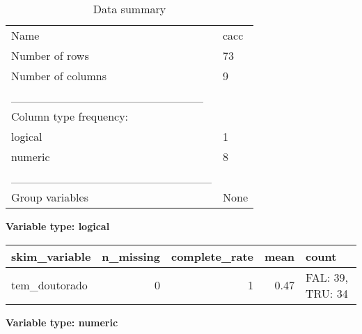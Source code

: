 \documentclass[
]{article}
\begin{document}
\begin{longtable}[]{@{}ll@{}}
\caption{Data summary}\tabularnewline
\toprule\noalign{}
\endfirsthead
\endhead
\bottomrule\noalign{}
\endlastfoot
Name & cacc \\
Number of rows & 73 \\
Number of columns & 9 \\
\_\_\_\_\_\_\_\_\_\_\_\_\_\_\_\_\_\_\_\_\_\_\_ & \\
Column type frequency: & \\
logical & 1 \\
numeric & 8 \\
\_\_\_\_\_\_\_\_\_\_\_\_\_\_\_\_\_\_\_\_\_\_\_\_ & \\
Group variables & None \\
\end{longtable}

\textbf{Variable type: logical}

\begin{longtable}[]{@{}lrrrl@{}}
\toprule\noalign{}
skim\_variable & n\_missing & complete\_rate & mean & count \\
\midrule\noalign{}
\endhead
\bottomrule\noalign{}
\endlastfoot
tem\_doutorado & 0 & 1 & 0.47 & FAL: 39, TRU: 34 \\
\end{longtable}

\textbf{Variable type: numeric}
\end{document}
